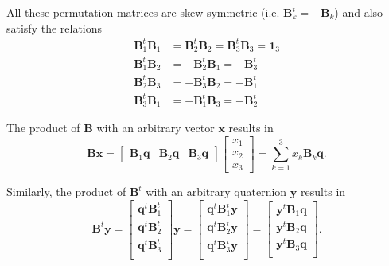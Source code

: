 \documentclass[aip,jcp,reprint,amsmath,amssymb,raggedbottom]{revtex4-1}
\newcommand{\mt}[1]{\boldsymbol{\mathbf{#1}}}           %
\newcommand{\vt}[1]{\boldsymbol{\mathbf{#1}}}           %
\newcommand{\tr}[1]{#1^t}                               %
\begin{document}
All these permutation matrices are skew-symmetric (i.e. $\tr{\mt B_k} = -\mt B_k$) and also satisfy the relations\cite{Dichmann1999}
\begin{equation}
\label{eq:BB_products}
\begin{aligned}
\tr{\mt B_1}{\mt B_1} &= \tr{\mt B_2}{\mt B_2} = \tr{\mt B_3}{\mt B_3} = \mt 1_3 \\
\tr{\mt B_1}{\mt B_2} &= -\tr{\mt B_2}{\mt B_1} = -\tr{\mt B_3} \\
\tr{\mt B_2}{\mt B_3} &= -\tr{\mt B_3}{\mt B_2} = -\tr{\mt B_1} \\
\tr{\mt B_3}{\mt B_1} &= -\tr{\mt B_1}{\mt B_3} = -\tr{\mt B_2}
\end{aligned}
\end{equation}

The product of $\mt B$ with an arbitrary vector $\vt x$ results in
\begin{equation}
\label{eq:product_B_vector}
\mt B \vt x = \left[ \begin{array}{ccc} \mt B_1 \vt q & \mt B_2 \vt q & \mt B_3 \vt q \end{array}\right] \left[ \begin{array}{c} x_1 \\ x_2 \\ x_3 \end{array} \right] = \sum_{k=1}^3 x_k {\mt B}_k \vt q.
\end{equation}

Similarly, the product of $\tr{\mt B}$ with an arbitrary quaternion $\vt y$ results in
\begin{equation}
\label{eq:vector_entries}
\tr{\mt B}\vt y =
\left[\begin{array}{c}
\tr{\vt q}\tr{\mt B}_1 \\
\tr{\vt q}\tr{\mt B}_2 \\
\tr{\vt q}\tr{\mt B}_3 \\
\end{array}\right]\vt y = 
\left[\begin{array}{c}
\tr{\vt q}\tr{\mt B}_1\vt y \\
\tr{\vt q}\tr{\mt B}_2\vt y \\
\tr{\vt q}\tr{\mt B}_3\vt y \\
\end{array}\right] = 
\left[\begin{array}{c}
\tr{\vt y}{\mt B}_1\vt q \\
\tr{\vt y}{\mt B}_2\vt q \\
\tr{\vt y}{\mt B}_3\vt q \\
\end{array}\right].
\end{equation}
\end{document}
